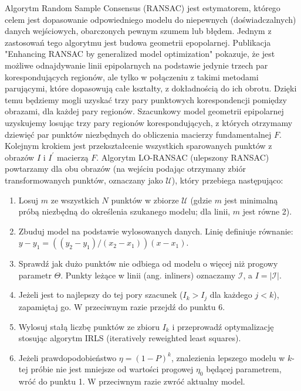 Algorytm Random Sample Consensus (RANSAC) \cite{ransac} jest estymatorem,
którego celem jest dopasowanie odpowiedniego modelu do niepewnych
(doświadczalnych) danych wejściowych, obarczonych pewnym szumem lub błędem.
Jednym z zastosowań tego algorytmu jest budowa geometrii epopolarnej.
Publikacja "Enhancing RANSAC by generalized model optimization" \cite{loransac}
pokazuje, że jest możliwe odnajdywanie linii epipolarnych na podstawie jedynie
trzech par korespondujących regionów, ale tylko w połączeniu z takimi metodami
parującymi, które dopasowują całe kształty, z dokładnością do ich obrotu.
Dzięki temu będziemy mogli uzyskać trzy pary punktowych korespondencji pomiędzy
obrazami, dla każdej pary regionów.  Szacunkowy model geometrii epipolarnej
uzyskujemy losując trzy pary regionów korespondujących, z których otrzymamy
dziewięć par punktów niezbędnych do obliczenia macierzy fundamentalnej $F$.
Kolejnym krokiem jest przekształcenie wszystkich sparowanych punktów z obrazów
$I$ i $I^\prime$ macierzą $F$.  Algorytm LO-RANSAC \cite{loransac} (ulepszony
RANSAC) powtarzamy dla obu obrazów (na wejściu podając otrzymany zbiór
transformowanych punktów, oznaczany jako $\mathcal{U}$), który przebiega
następująco: \begin{enumerate} \item Losuj $m$ ze wszystkich $N$ punktów w
    zbiorze $\mathcal{U}$ (gdzie $m$ jest minimalną próbą niezbędną do
    określenia szukanego modelu; dla linii, $m$ jest równe 2). \item Zbuduj
    model na podstawie wylosowanych danych. Linię definiuje równanie: $y - y_1
    = (( y_2 - y_1 ) / ( x_2 - x_1 )) (x - x_1)$.  \item Sprawdź jak dużo
    punktów nie odbiega od modelu o więcej niż progowy parametr $\Theta$.
    Punkty leżące w linii (ang. inliners) oznaczamy $\mathcal{I}$, a $I =
    |\mathcal{I}|$.  \item Jeżeli jest to najlepszy do tej pory szacunek ($I_k
    > I_j$ dla każdego $j < k$), zapamiętaj go. W przeciwnym razie przejdź do
    punktu 6. \item Wylosuj stałą liczbę punktów ze zbioru $I_k$ i przeprowadź
    optymalizację stosując algorytm IRLS (iteratively reweighted least
    squares). \item Jeżeli prawdopodobieństwo $\eta = (1-P)^k$, znalezienia
    lepszego modelu w $k$-tej próbie nie jest mniejsze od wartości progowej
    $\eta_0$ będącej parametrem, wróć do punktu 1. W przeciwnym razie zwróć
    aktualny model. \end{enumerate}


